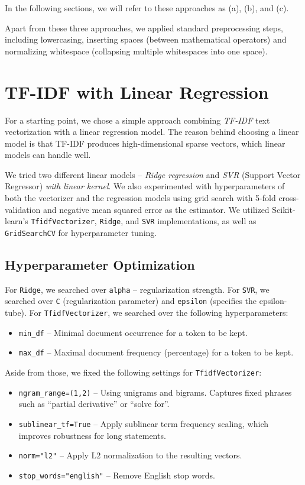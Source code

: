 \documentclass[runningheads]{llncs}
\begin{document}
In the following sections, we will refer to these approaches as (a), (b), and (c).

Apart from these three approaches, we applied standard preprocessing steps, including lowercasing, inserting spaces (between mathematical operators) and normalizing whitespace (collapsing multiple whitespaces into one space).


\section{TF-IDF with Linear Regression}
\label{sec:tfidf}

For a starting point, we chose a simple approach combining \textit{TF-IDF} text vectorization with a linear regression model. The reason behind choosing a linear model is that TF-IDF produces high-dimensional sparse vectors, which linear models can handle well.

We tried two different linear models -- \textit{Ridge regression} and \textit{SVR} (Support Vector Regressor) \textit{with linear kernel}. We also experimented with hyperparameters of both the vectorizer and the regression models using grid search with 5-fold cross-validation and negative mean squared error as the estimator. We utilized Scikit-learn's \cite{scikit-learn} \texttt{TfidfVectorizer}, \texttt{Ridge}, and \texttt{SVR} implementations, as well as \texttt{GridSearchCV} for hyperparameter tuning.

\subsection{Hyperparameter Optimization}

For \texttt{Ridge}, we searched over \texttt{alpha} -- regularization strength. For \texttt{SVR}, we searched over \texttt{C} (regularization parameter) and \texttt{epsilon} (specifies the epsilon-tube). For \texttt{TfidfVectorizer}, we searched over the following hyperparameters:

\begin{itemize}
    \item \texttt{min\_df} -- Minimal document occurrence for a token to be kept.
    \item \texttt{max\_df} -- Maximal document frequency (percentage) for a token to be kept.
\end{itemize}

Aside from those, we fixed the following settings for \texttt{TfidfVectorizer}:

\begin{itemize}
    \item \texttt{ngram\_range=(1,2)} -- Using unigrams and bigrams. Captures fixed phrases such as ``partial derivative'' or ``solve for''.
    \item \texttt{sublinear\_tf=True} -- Apply sublinear term frequency scaling, which improves robustness for long statements.
    \item \texttt{norm="l2"} -- Apply L2 normalization to the resulting vectors.
    \item \texttt{stop\_words="english"} -- Remove English stop words.
\end{itemize}
\end{document}
